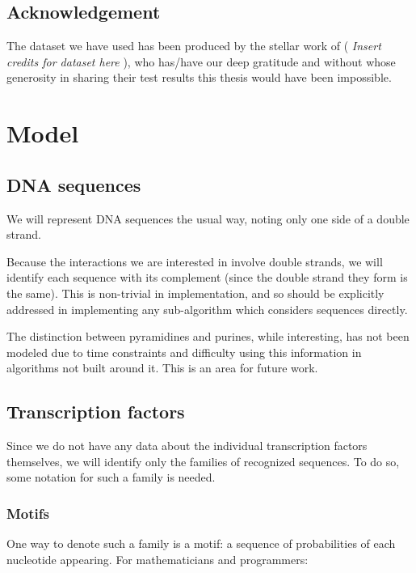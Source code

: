 \documentclass[fleqn]{book}
\begin{document}
\section{Acknowledgement}\label{acknowledgement}

The dataset we have used has been produced by the stellar work of
(\emph{ Insert credits for dataset here }), who has/have our deep
gratitude and without whose generosity in sharing their test results
this thesis would have been impossible.

\hypertarget{model}{\chapter{Model}\label{model}}

\section{DNA sequences}\label{dna-sequences}

We will represent DNA sequences the usual way, noting only one side of a
double strand.

Because the interactions we are interested in involve double strands, we
will identify each sequence with its complement (since the double strand
they form is the same). This is non-trivial in implementation, and so
should be explicitly addressed in implementing any sub-algorithm which
considers sequences directly.

The distinction between pyramidines and purines, while interesting, has
not been modeled due to time constraints and difficulty using this
information in algorithms not built around it. This is an area for
future work.

\hypertarget{transcription-factors-1}{\section{Transcription
factors}\label{transcription-factors-1}}

Since we do not have any data about the individual transcription factors
themselves, we will identify only the families of recognized sequences.
To do so, some notation for such a family is needed.

\subsection{Motifs}\label{motifs}

One way to denote such a family is a motif: a sequence of probabilities
of each nucleotide appearing. For mathematicians and programmers:
\end{document}
